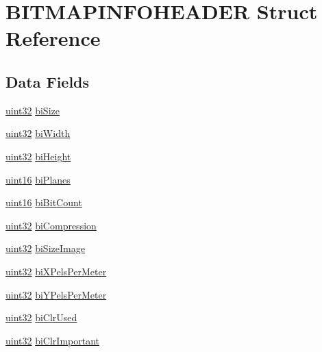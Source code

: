 \hypertarget{structBITMAPINFOHEADER}{\section{B\+I\+T\+M\+A\+P\+I\+N\+F\+O\+H\+E\+A\+D\+E\+R Struct Reference}
\label{structBITMAPINFOHEADER}
}
\subsection*{Data Fields}
\begin{DoxyCompactItemize}
\item 
\hyperlink{image__format_8c_a9695cf1104606879c5d3f0221635a069}{uint32} \hyperlink{structBITMAPINFOHEADER_a7e3eb39ca20f49ccb7d7d5d1d3cfa6e7}{bi\+Size}
\item 
\hyperlink{image__format_8c_a9695cf1104606879c5d3f0221635a069}{uint32} \hyperlink{structBITMAPINFOHEADER_ac490e64690c13c3b425d21eb25043cca}{bi\+Width}
\item 
\hyperlink{image__format_8c_a9695cf1104606879c5d3f0221635a069}{uint32} \hyperlink{structBITMAPINFOHEADER_a9dddc8e5104f49e7feec78835bf7afbb}{bi\+Height}
\item 
\hyperlink{image__format_8c_afc4adc9111e54b3163b6126ce951ecc3}{uint16} \hyperlink{structBITMAPINFOHEADER_a77085881f424179a3c4ceaa728e1a81f}{bi\+Planes}
\item 
\hyperlink{image__format_8c_afc4adc9111e54b3163b6126ce951ecc3}{uint16} \hyperlink{structBITMAPINFOHEADER_a9538a3f40f9f57cd5b82b698e1855015}{bi\+Bit\+Count}
\item 
\hyperlink{image__format_8c_a9695cf1104606879c5d3f0221635a069}{uint32} \hyperlink{structBITMAPINFOHEADER_a43ec6e8e10f0c7fdf9bc9c892a22a028}{bi\+Compression}
\item 
\hyperlink{image__format_8c_a9695cf1104606879c5d3f0221635a069}{uint32} \hyperlink{structBITMAPINFOHEADER_afcbafaf232b04775a6c4762d6c79ba00}{bi\+Size\+Image}
\item 
\hyperlink{image__format_8c_a9695cf1104606879c5d3f0221635a069}{uint32} \hyperlink{structBITMAPINFOHEADER_a2b93177924fd3803a050bf3daaf23ee4}{bi\+X\+Pels\+Per\+Meter}
\item 
\hyperlink{image__format_8c_a9695cf1104606879c5d3f0221635a069}{uint32} \hyperlink{structBITMAPINFOHEADER_ad43bb286a1a2067b45d1c9b701c384a7}{bi\+Y\+Pels\+Per\+Meter}
\item 
\hyperlink{image__format_8c_a9695cf1104606879c5d3f0221635a069}{uint32} \hyperlink{structBITMAPINFOHEADER_a4d48257999bea13ade311dda1448f2d0}{bi\+Clr\+Used}
\item 
\hyperlink{image__format_8c_a9695cf1104606879c5d3f0221635a069}{uint32} \hyperlink{structBITMAPINFOHEADER_a5ef05c009e392db1cc9c3d41292928c8}{bi\+Clr\+Important}
\end{DoxyCompactItemize}


